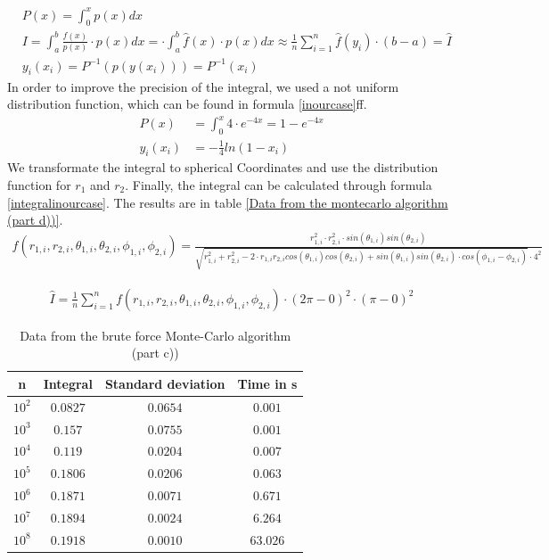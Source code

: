 \documentclass[10pt,a4paper]{article}
\begin{document}
\begin{align}
&P(x) = \int_{0}^{x} p(x) dx \label{P(x)}\\
& I =  \int_{a}^{b} \frac{f(x)}{p(x)} \cdot p(x) dx = \cdot \int_{a}^{b} \hat{f}(x) \cdot p(x) dx \approx  \frac{1}{n} \sum_{i=1}^{n} \hat{f}(y_i) \cdot (b-a) = \hat{I} \\
&y_i(x_i) =P^{-1}\left(p(y(x_i))\right)= P^{-1}(x_i)\label{with distribution}
\end{align}
In order to improve the precision of the integral, we used a not uniform distribution function, which can be found in formula \ref{inourcase}ff. 
\begin{align}
P(x)&= \int_{0}^{x} 4 \cdot e^{-4 x} = 1- e^{-4x} \label{inourcase}\\
y_i(x_i)&= -\frac{1}{4} ln(1-x_i)
\end{align}
We transformate the integral to spherical Coordinates and use the distribution function for $r_1$ and $r_2$. Finally, the integral can be calculated through formula \ref{integralinourcase}. The results are in table \ref{Data from the  montecarlo algorithm (part d))}.
\begin{align}
f( r_{1,i}, r_{2,i}, \theta_{1,i}, \theta_{2,i}, \phi_{1,i}, \phi_{2,i}) = \frac{r_{1,i}^2 \cdot r_{2,i}^2 \cdot sin(\theta_{1,i}) sin(\theta_{2,i}) }{\sqrt{r_{1,i}^2+r_{2,i}^2-2 \cdot r_{1,i} r_{2,i}  cos(\theta_{1,i}) cos(\theta_{2,i}) + sin(\theta_{1,i}) sin(\theta_{2,i}) \cdot cos(\phi_{1,i}-\phi_{2,i})}\cdot 4^2}
\end{align}

\begin{align}
\hat{I}= \frac{1}{n} \sum_{i=1}^{n} f( r_{1,i}, r_{2,i}, \theta_{1,i}, \theta_{2,i}, \phi_{1,i}, \phi_{2,i}) \cdot (2 \pi - 0)^2 \cdot (\pi -0)^2  \label{integralinourcase}
\end{align}

\begin{table}[h]
\centering
\caption{Data from the brute force Monte-Carlo algorithm (part c))}
\label{Data from the brute force montecarlo algorithm (part c))}
\begin{tabular}{c|c|c|c}
n & Integral & Standard deviation & Time in s \\
\hline\hline
$10^2$ & $0.0827$ & $0.0654$ & $0.001$\\
$10^3$ & $0.157$ & $0.0755$ & $0.001$\\
$10^4$ & $0.119$ & $0.0204$ & $0.007$\\
$10^5$ & $0.1806$ & $0.0206$ & $0.063$\\
$10^6$ & $0.1871$ & $0.0071$ & $0.671$\\
$10^7$ & $0.1894$ & $0.0024$ & $6.264$\\
$10^8$ & $0.1918$ & $0.0010$ & $63.026$\\
\end{tabular}
\end{table}
\end{document}
